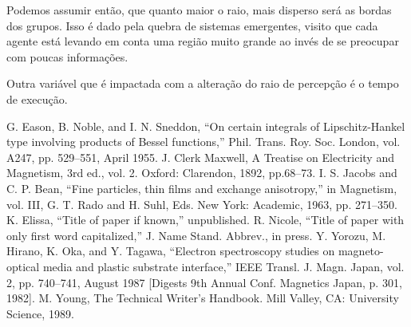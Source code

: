 \documentclass[conference]{IEEEtran}
\begin{document}
Podemos assumir então, que quanto maior o raio, mais disperso será as bordas dos grupos. Isso é dado pela quebra de sistemas emergentes, visito que cada agente está levando em conta uma região muito grande ao invés de se preocupar com poucas informações.

Outra variável que  é impactada com a alteração do raio de percepção é o tempo de execução.
%

\begin{thebibliography}{00}
 G. Eason, B. Noble, and I. N. Sneddon, ``On certain integrals of Lipschitz-Hankel type involving products of Bessel functions,'' Phil. Trans. Roy. Soc. London, vol. A247, pp. 529--551, April 1955.
 J. Clerk Maxwell, A Treatise on Electricity and Magnetism, 3rd ed., vol. 2. Oxford: Clarendon, 1892, pp.68--73.
 I. S. Jacobs and C. P. Bean, ``Fine particles, thin films and exchange anisotropy,'' in Magnetism, vol. III, G. T. Rado and H. Suhl, Eds. New York: Academic, 1963, pp. 271--350.
 K. Elissa, ``Title of paper if known,'' unpublished.
 R. Nicole, ``Title of paper with only first word capitalized,'' J. Name Stand. Abbrev., in press.
 Y. Yorozu, M. Hirano, K. Oka, and Y. Tagawa, ``Electron spectroscopy studies on magneto-optical media and plastic substrate interface,'' IEEE Transl. J. Magn. Japan, vol. 2, pp. 740--741, August 1987 [Digests 9th Annual Conf. Magnetics Japan, p. 301, 1982].
 M. Young, The Technical Writer's Handbook. Mill Valley, CA: University Science, 1989.
\end{thebibliography}
\end{document}
